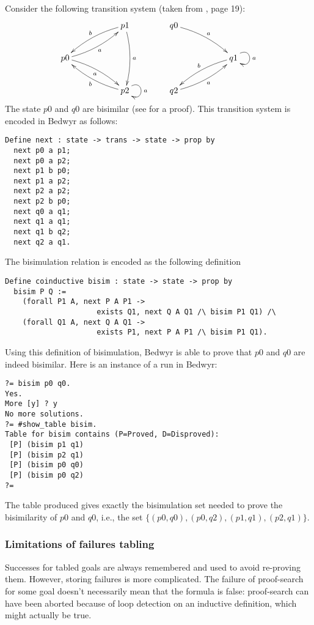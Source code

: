 \documentclass{article}
\begin{document}
Consider the following transition system (taken from \cite{milner99book},
page 19):
$$
\xymatrix{
   &  & p1 \ar@/_/[lld]_b \ar@/^/[dd]^a \\
p0 \ar@/_/[rru]_a \ar@/^/[rrd]_a \\
 & & p2 \ar@(ur,dr)^a \ar@/^/[llu]^b
}
\qquad
\xymatrix{
q0 \ar@/^/[rrd]^a \\
 & & q1 \ar@(ur,dr)^a \ar@/_/[dll]_b \\
q2 \ar@/_/[rru]_a
}
$$
The state $p0$ and $q0$ are bisimilar (see \cite{milner99book} for a proof).
This transition system is encoded in Bedwyr as follows:
\begin{verbatim}
Define next : state -> trans -> state -> prop by
  next p0 a p1;
  next p0 a p2;
  next p1 b p0;
  next p1 a p2;
  next p2 a p2;
  next p2 b p0;
  next q0 a q1;
  next q1 a q1;
  next q1 b q2;
  next q2 a q1.
\end{verbatim}
The bisimulation relation is encoded as the following definition
\begin{verbatim}
Define coinductive bisim : state -> state -> prop by
  bisim P Q :=
    (forall P1 A, next P A P1 ->
                     exists Q1, next Q A Q1 /\ bisim P1 Q1) /\
    (forall Q1 A, next Q A Q1 ->
                     exists P1, next P A P1 /\ bisim P1 Q1).
\end{verbatim}
Using this definition of bisimulation, Bedwyr is able to prove that
$p0$ and $q0$ are indeed bisimilar. Here is an instance of a run in Bedwyr:
\begin{verbatim}
?= bisim p0 q0.
Yes.
More [y] ? y
No more solutions.
?= #show_table bisim.
Table for bisim contains (P=Proved, D=Disproved):
 [P] (bisim p1 q1)
 [P] (bisim p2 q1)
 [P] (bisim p0 q0)
 [P] (bisim p0 q2)
?=
\end{verbatim}
The table produced gives exactly the bisimulation set
needed to prove the bisimilarity of $p0$ and $q0$, i.e.,
the set $\{(p0,q0), (p0, q2), (p1,q1), (p2,q1) \}.$

\subsubsection{Limitations of failures tabling}
\label{restrict-failures-tabling}

Successes for tabled goals are always remembered and used to avoid
re-proving them. However, storing failures is more complicated.
The failure of proof-search for some goal doesn't necessarily mean
that the formula is false: proof-search can have been aborted because
of loop detection on an inductive definition, which might actually be true.
\end{document}
